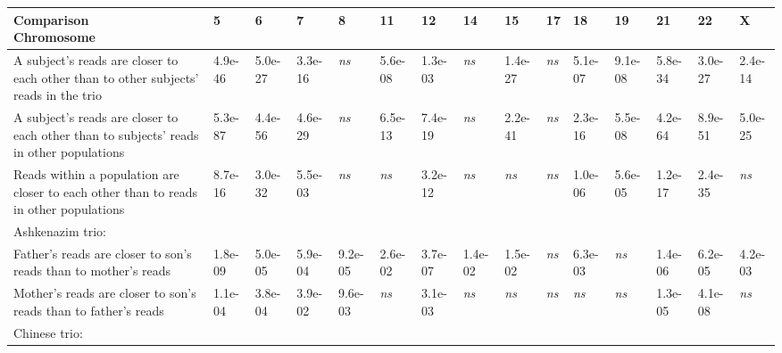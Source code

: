 \begin{samepage} \begin{table}[h!] \small \begin{tabular}{lllllllllllllll}
\hline
\textbf{Comparison\\Chromosome}                                                         & \textbf{5}  & \textbf{6}  & \textbf{7}  & \textbf{8}  & \textbf{11} & \textbf{12} & \textbf{14} & \textbf{15} & \textbf{17} & \textbf{18} & \textbf{19} & \textbf{21} & \textbf{22} & \textbf{X}  \\
\hline
A subject's reads are closer to each other than to other subjects' reads in the trio    & 4.9e-46     & 5.0e-27     & 3.3e-16     & \textit{ns} & 5.6e-08     & 1.3e-03     & \textit{ns} & 1.4e-27     & \textit{ns} & 5.1e-07     & 9.1e-08     & 5.8e-34     & 3.0e-27     & 2.4e-14     \\
A subject's reads are closer to each other than to subjects' reads in other populations & 5.3e-87     & 4.4e-56     & 4.6e-29     & \textit{ns} & 6.5e-13     & 7.4e-19     & \textit{ns} & 2.2e-41     & \textit{ns} & 2.3e-16     & 5.5e-08     & 4.2e-64     & 8.9e-51     & 5.0e-25     \\
Reads within a population are closer to each other than to reads in other populations   & 8.7e-16     & 3.0e-32     & 5.5e-03     & \textit{ns} & \textit{ns} & 3.2e-12     & \textit{ns} & \textit{ns} & \textit{ns} & 1.0e-06     & 5.6e-05     & 1.2e-17     & 2.4e-35     & \textit{ns} \\
Ashkenazim trio:                                                                        & \textbf{}   & \textbf{}   & \textbf{}   & \textbf{}   &  \textbf{}  & \textbf{}   & \textbf{}   & \textbf{}   & \textbf{}   & \textbf{}   & \textbf{}   & \textbf{}   & \textbf{}   & \textbf{}   \\
Father's reads are closer to son's reads than to mother's reads                         & 1.8e-09     & 5.0e-05     & 5.9e-04     & 9.2e-05     & 2.6e-02     & 3.7e-07     & 1.4e-02     & 1.5e-02     & \textit{ns} & 6.3e-03     & \textit{ns} & 1.4e-06     & 6.2e-05     & 4.2e-03     \\
Mother's reads are closer to son's reads than to father's reads                         & 1.1e-04     & 3.8e-04     & 3.9e-02     & 9.6e-03     & \textit{ns} & 3.1e-03     & \textit{ns} & \textit{ns} & \textit{ns} & \textit{ns} & \textit{ns} & 1.3e-05     & 4.1e-08     & \textit{ns} \\
Chinese trio:                                                                           & \textbf{}   & \textbf{}   & \textbf{}   & \textbf{}   &  \textbf{}  & \textbf{}   & \textbf{}   & \textbf{}   & \textbf{}   & \textbf{}   & \textbf{}   & \textbf{}   & \textbf{}   & \textbf{}   \\

\end{tabular}
\end{table}
\end{samepage}
